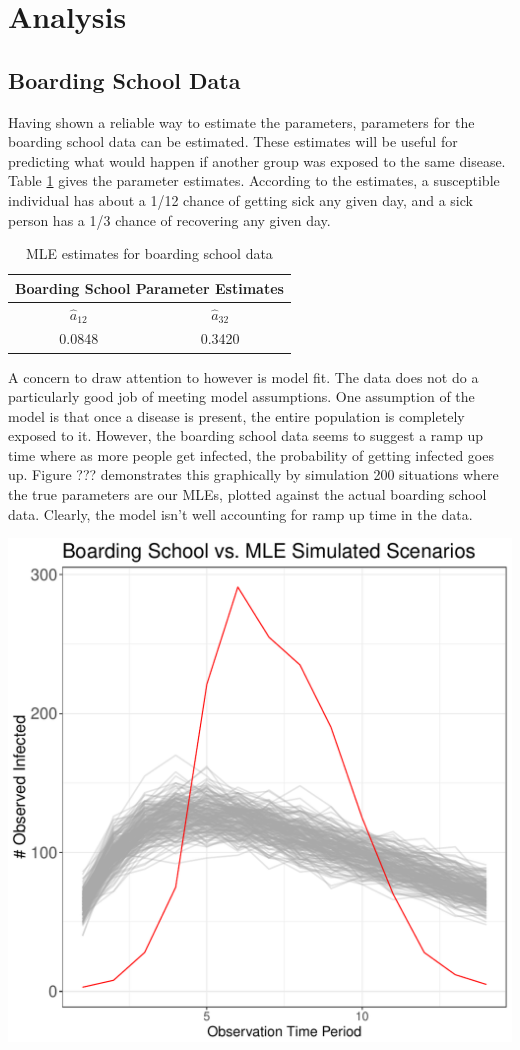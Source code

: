 \documentclass{svproc}
\begin{document}
\section{Analysis}
\subsection*{Boarding School Data}
Having shown a reliable way to estimate the parameters, parameters for the boarding school data can be estimated. These estimates will be useful for predicting what would happen if another group was exposed to the same disease. Table \ref{tab2} gives the parameter estimates. According to the estimates, a susceptible individual has about a 1/12 chance of getting sick any given day, and a sick person has a 1/3 chance of recovering any given day.
\begin{table}
\centering
\setlength{\tabcolsep}{30pt}
\begin{tabular}{|c|c|}

\hline
\multicolumn{2}{|c|}{Boarding School Parameter Estimates} \\ \hline 
$\hat{a}_{12}$ & $\hat{a}_{32}$ \\ \hline
0.0848 & 0.3420 \\ \hline
\end{tabular}
\caption{MLE estimates for boarding school data}
\label{tab2}
\end{table}

A concern to draw attention to however is model fit. The data does not do a particularly good job of meeting model assumptions. One assumption of the model is that once a disease is present, the entire population is completely exposed to it. However, the boarding school data seems to suggest a ramp up time where as more people get infected, the probability of getting infected goes up. Figure ??? demonstrates this graphically by simulation 200 situations where the true parameters are our MLEs, plotted against the actual boarding school data. Clearly, the model isn't well accounting for ramp up time in the data.

\includegraphics[scale=.3]{LackOfFit.pdf}
\end{document}
